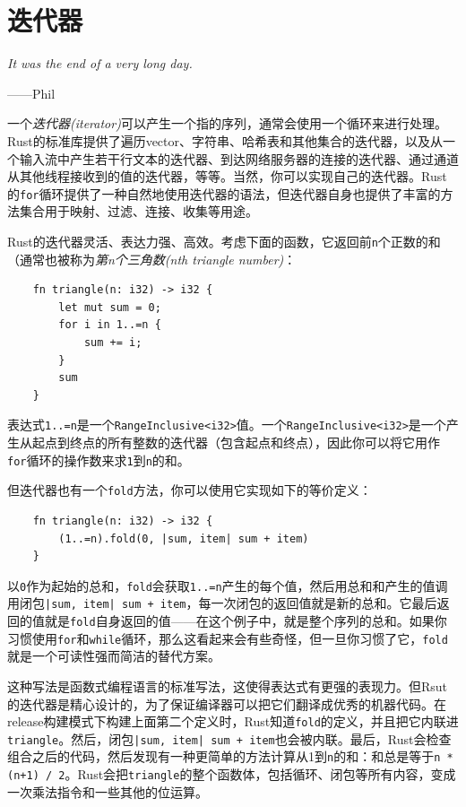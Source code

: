 \chapter{迭代器}\label{ch15}

\emph{It was the end of a very long day.}

\begin{flushright}
    ——Phil
\end{flushright}

一个\emph{迭代器(iterator)}可以产生一个指的序列，通常会使用一个循环来进行处理。Rust的标准库提供了遍历vector、字符串、哈希表和其他集合的迭代器，以及从一个输入流中产生若干行文本的迭代器、到达网络服务器的连接的迭代器、通过通道从其他线程接收到的值的迭代器，等等。当然，你可以实现自己的迭代器。Rust的\texttt{for}循环提供了一种自然地使用迭代器的语法，但迭代器自身也提供了丰富的方法集合用于映射、过滤、连接、收集等用途。

Rust的迭代器灵活、表达力强、高效。考虑下面的函数，它返回前\texttt{n}个正数的和（通常也被称为\emph{第n个三角数(nth triangle number)}：
\begin{verbatim}
    fn triangle(n: i32) -> i32 {
        let mut sum = 0;
        for i in 1..=n {
            sum += i;
        }
        sum
    }
\end{verbatim}

表达式\texttt{1..=n}是一个\texttt{RangeInclusive<i32>}值。一个\texttt{RangeInclusive<i32>}是一个产生从起点到终点的所有整数的迭代器（包含起点和终点），因此你可以将它用作\texttt{for}循环的操作数来求\texttt{1}到\texttt{n}的和。

但迭代器也有一个\texttt{fold}方法，你可以使用它实现如下的等价定义：
\begin{verbatim}
    fn triangle(n: i32) -> i32 {
        (1..=n).fold(0, |sum, item| sum + item)
    }
\end{verbatim}

以\texttt{0}作为起始的总和，\texttt{fold}会获取\texttt{1..=n}产生的每个值，然后用总和和产生的值调用闭包\texttt{|sum, item| sum + item}，每一次闭包的返回值就是新的总和。它最后返回的值就是\texttt{fold}自身返回的值——在这个例子中，就是整个序列的总和。如果你习惯使用\texttt{for}和\texttt{while}循环，那么这看起来会有些奇怪，但一旦你习惯了它，\texttt{fold}就是一个可读性强而简洁的替代方案。

这种写法是函数式编程语言的标准写法，这使得表达式有更强的表现力。但Rsut的迭代器是精心设计的，为了保证编译器可以把它们翻译成优秀的机器代码。在release构建模式下构建上面第二个定义时，Rust知道\texttt{fold}的定义，并且把它内联进\texttt{triangle}。然后，闭包\texttt{|sum, item| sum + item}也会被内联。最后，Rust会检查组合之后的代码，然后发现有一种更简单的方法计算从1到\texttt{n}的和：和总是等于\texttt{n * (n+1) / 2}。Rust会把\texttt{triangle}的整个函数体，包括循环、闭包等所有内容，变成一次乘法指令和一些其他的位运算。


